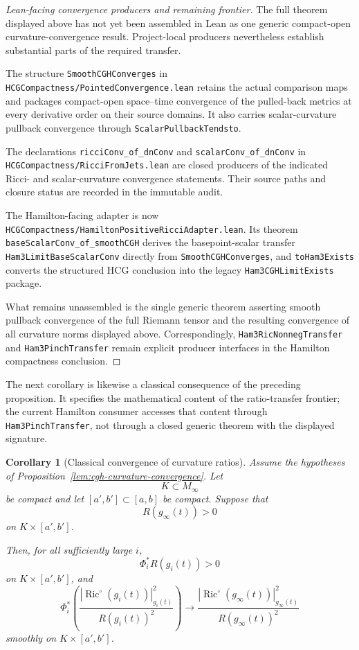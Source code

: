 \documentclass[11pt]{article}
\theoremstyle{plain}
\newtheorem{corollary}[theorem]{Corollary}
\theoremstyle{definition}
\theoremstyle{remark}
\newcommand{\Ric}{\operatorname{Ric}}
\newcommand{\norm}[1]{\left|#1\right|}
\newcommand{\leanref}[1]{\nolinkurl{#1}}
\newcommand{\leanfile}[1]{\nolinkurl{#1}}
\newcommand{\rffile}[1]{\leanfile{#1}}
\begin{document}
\begin{proof}[Lean-facing convergence producers and remaining frontier]
The full theorem displayed above has not yet been assembled in Lean as one
generic compact-open curvature-convergence result.  Project-local producers
nevertheless establish substantial parts of the required transfer.

The structure \leanref{SmoothCGHConverges} in
\rffile{HCGCompactness/PointedConvergence.lean} retains the actual comparison
maps and packages compact-open space--time convergence of the pulled-back metrics
at every derivative order on their source domains.  It also carries
scalar-curvature pullback convergence through
\leanref{ScalarPullbackTendsto}.

The declarations \leanref{ricciConv_of_dnConv} and
\leanref{scalarConv_of_dnConv} in
\rffile{HCGCompactness/RicciFromJets.lean} are closed producers of the indicated
Ricci- and scalar-curvature convergence statements.  Their source paths and
closure status are recorded in the immutable audit.

The Hamilton-facing adapter is now
\rffile{HCGCompactness/HamiltonPositiveRicciAdapter.lean}.  Its theorem
\leanref{baseScalarConv_of_smoothCGH} derives the basepoint-scalar transfer
\leanref{Ham3LimitBaseScalarConv} directly from
\leanref{SmoothCGHConverges}, and \leanref{toHam3Exists} converts the structured
HCG conclusion into the legacy \leanref{Ham3CGHLimitExists} package.

What remains unassembled is the single generic theorem asserting smooth
pullback convergence of the full Riemann tensor and the resulting convergence
of all curvature norms displayed above.  Correspondingly,
\leanref{Ham3RicNonnegTransfer} and \leanref{Ham3PinchTransfer} remain explicit
producer interfaces in the Hamilton compactness conclusion.

\end{proof}

The next corollary is likewise a classical consequence of the preceding
proposition.  It specifies the mathematical content of the ratio-transfer
frontier; the current Hamilton consumer accesses that content through
\leanref{Ham3PinchTransfer}, not through a closed generic theorem with the
displayed signature.

\begin{corollary}[Classical convergence of curvature ratios]
\label{cor:cgh-curvature-ratio-convergence}
Assume the hypotheses of
Proposition~\ref{lem:cgh-curvature-convergence}. Let
\[
K\subset M_\infty
\]
be compact and let $[a',b']\subset [a,b]$ be compact. Suppose that
\[
R(g_\infty(t))>0
\]
on $K\times [a',b']$.

Then, for all sufficiently large $i$,
\[
\Phi_i^*R(g_i(t))>0
\]
on $K\times [a',b']$, and
\[
\Phi_i^*
\left(
\frac{\norm{\Ric^\circ(g_i(t))}_{g_i(t)}^2}{R(g_i(t))^2}
\right)
\to
\frac{\norm{\Ric^\circ(g_\infty(t))}_{g_\infty(t)}^2}{R(g_\infty(t))^2}
\]
smoothly on $K\times [a',b']$.
\end{corollary}
\end{document}
